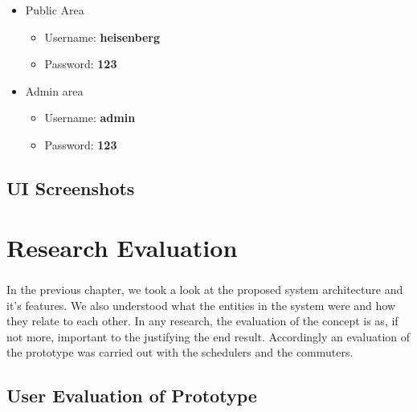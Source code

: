 \documentclass[12pt, oneside]{report}
\begin{document}
\begin {itemize}

\item Public Area
\begin {itemize}
\item Username: \textbf{heisenberg}
\item Password: \textbf{123}
\end {itemize}

\item Admin area
\begin {itemize}
\item Username: \textbf{admin}
\item Password: \textbf{123}
\end {itemize}

\end {itemize}

\section{UI Screenshots}

\paragraph{ } 


\newpage





\chapter {Research Evaluation}
\label{chapter-ResearchEvaluation}

\paragraph {} In the previous chapter, we took a look at the proposed system architecture and it's features. We also understood what the entities in the system were and how they relate to each other. In any research, the evaluation of the concept is as, if not more, important to the justifying the end result. Accordingly an evaluation of the prototype was carried out with the schedulers and the commuters.

\section{User Evaluation of Prototype}
\end{document}
